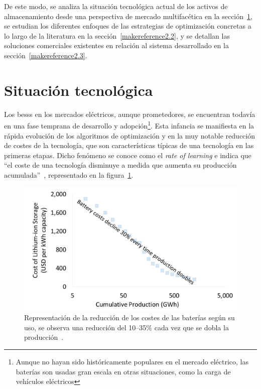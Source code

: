 De este modo, se analiza la situación tecnológica actual de los activos de almacenamiento desde una perspectiva de mercado multifacética en la sección~\ref{makereference2.1}, se estudian los diferentes enfoques de las estrategias de optimización concretas a lo largo de la literatura en la sección~\ref{makereference2.2}, y se detallan las soluciones comerciales existentes en relación al sistema desarrollado en la sección~\ref{makereference2.3}.

\section{Situación tecnológica}
\label{makereference2.1}

Los \glspl{bess} en los mercados eléctricos, aunque prometedores, se encuentran todavía en una fase temprana de desarrollo y adopción\footnote{Aunque no hayan sido históricamente populares en el mercado eléctrico, las baterías son usadas  gran escala en otras situaciones, como la carga de vehículos eléctricos}. Esta infancia se manifiesta en la rápida evolución de los algoritmos de optimización y en la muy notable reducción de costes de la tecnología, que son características típicas de una tecnología en las primeras etapas. Dicho fenómeno se conoce como el \textit{rate of learning} e indica que ``el coste de una tecnología disminuye a medida que aumenta su producción acumulada''~\cite{mathew2021climate, louwen2018technological}, representado en la figura~\ref{fig:rate-of-learning}.

\begin{figure}
  \centering
  \includegraphics[width=0.75\linewidth]{figures/rate-of-learning.jpg}
  \caption{Representación de la reducción de los costes de las baterías según su uso, se observa una reducción del 10--35\% cada vez que se dobla la producción~\cite{irena2025irena}.}
  \label{fig:rate-of-learning}
\end{figure}

